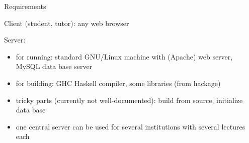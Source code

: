 \begin{slide}{Requirements}

Client (student, tutor): any web browser

Server:
\begin{itemize}
\item 
  for running: standard GNU/Linux machine with (Apache) web server,
  MySQL data base server 
\item for building: GHC Haskell compiler, some libraries (from hackage)
\item
  tricky parts (currently not well-documented):
  build from source, initialize data base
\item one central server can be used for several institutions
  with several lectures each
\end{itemize}


\end{slide}
